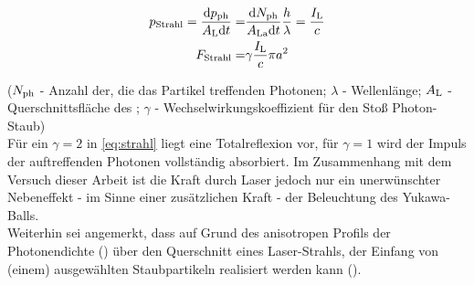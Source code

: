       \begin{align}
        p_\text{Strahl}=\frac{\textnormal{d} p_\text{ph}}{A_\text{L}\textnormal{d} t}=&\frac{\textnormal{d} N_\text{ph}}{A_\text{La}\textnormal{d} t}\frac{h}{\lambda}=\frac{I_\text{L}}{c} \nonumber \\
        F_\text{Strahl}=&\gamma\frac{I_\text{L}}{c}\pi a^2 \label{eq:strahl}
      \end{align}

    ($N_\text{ph}$ - Anzahl der, die das Partikel treffenden Photonen; $\lambda$ - Wellenlänge; $A_\text{L}$ - Querschnittsfläche des ; $\gamma$ - Wechselwirkungskoeffizient für den Stoß Photon-Staub)\\
    Für ein $\gamma=2$ in \autoref{eq:strahl} liegt eine Totalreflexion vor, für $\gamma=1$ wird der Impuls der auftreffenden Photonen vollständig absorbiert. Im Zusammenhang mit dem Versuch dieser Arbeit ist die Kraft durch Laser jedoch nur ein unerwünschter Nebeneffekt - im Sinne einer zusätzlichen Kraft - der Beleuchtung des Yukawa-Balls.\\
    Weiterhin sei angemerkt, dass auf Grund des anisotropen Profils der Photonendichte () über den Querschnitt eines Laser-Strahls, der Einfang von (einem) ausgewählten Staubpartikeln realisiert werden kann ().


